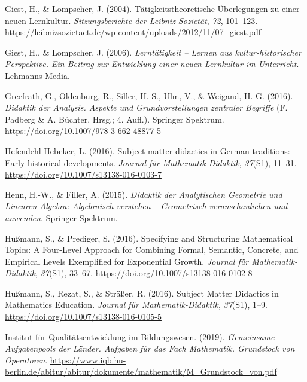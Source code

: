 \documentclass[
]{scrbook}
\newlength{\cslhangindent}
\newlength{\cslentryspacingunit} %
\newenvironment{CSLReferences}[2] %
 {%
  \setlength{\parindent}{0pt}
  \ifodd #1
  \let\oldpar\par
  \def\par{\hangindent=\cslhangindent\oldpar}
  \fi
  \setlength{\parskip}{#2\cslentryspacingunit}
 }%
 {}
\theoremstyle{definition}
\theoremstyle{definition}
\theoremstyle{definition}
\theoremstyle{definition}
\theoremstyle{remark}
\begin{document}
\begin{CSLReferences}{1}{0}
\leavevmode{}%
Giest, H., \& Lompscher, J. (2004). Tätigkeitstheoretische Überlegungen zu einer neuen {Lernkultur}. \emph{Sitzungsberichte der Leibniz-Sozietät}, \emph{72}, 101--123. \url{https://leibnizsozietaet.de/wp-content/uploads/2012/11/07_giest.pdf}

\leavevmode{}%
Giest, H., \& Lompscher, J. (2006). \emph{Lerntätigkeit -- {Lernen} aus kultur-historischer {Perspektive}. {Ein} {Beitrag} zur {Entwicklung} einer neuen {Lernkultur} im {Unterricht}}. Lehmanns Media.

\leavevmode{}%
Greefrath, G., Oldenburg, R., Siller, H.-S., Ulm, V., \& Weigand, H.-G. (2016). \emph{Didaktik der {Analysis}. {Aspekte} und {Grundvorstellungen} zentraler {Begriffe}} (F. Padberg \& A. Büchter, Hrsg.; 4. Aufl.). Springer Spektrum. \url{https://doi.org/10.1007/978-3-662-48877-5}

\leavevmode{}%
Hefendehl-Hebeker, L. (2016). Subject-matter didactics in {German} traditions: {Early} historical developments. \emph{Journal für Mathematik-Didaktik}, \emph{37}(S1), 11--31. \url{https://doi.org/10.1007/s13138-016-0103-7}

\leavevmode{}%
Henn, H.-W., \& Filler, A. (2015). \emph{Didaktik der {Analytischen} {Geometrie} und {Linearen} {Algebra}: {Algebraisch} verstehen -- {Geometrisch} veranschaulichen und anwenden}. Springer Spektrum.

\leavevmode{}%
Hußmann, S., \& Prediger, S. (2016). Specifying and Structuring Mathematical Topics: A Four-Level Approach for Combining Formal, Semantic, Concrete, and Empirical Levels Exemplified for Exponential Growth. \emph{Journal für Mathematik-Didaktik}, \emph{37}(S1), 33--67. \url{https://doi.org/10.1007/s13138-016-0102-8}

\leavevmode{}%
Hußmann, S., Rezat, S., \& Sträßer, R. (2016). Subject {Matter} {Didactics} in {Mathematics} {Education}. \emph{Journal für Mathematik-Didaktik}, \emph{37}(S1), 1--9. \url{https://doi.org/10.1007/s13138-016-0105-5}

\leavevmode{}%
Institut für Qualitätsentwicklung im Bildungswesen. (2019). \emph{Gemeinsame {Aufgabenpools} der {Länder}. {Aufgaben} für das {Fach} {Mathematik}. {Grundstock} von {Operatoren}}. \url{https://www.iqb.hu-berlin.de/abitur/abitur/dokumente/mathematik/M_Grundstock_von.pdf}


\end{CSLReferences}
\end{document}
